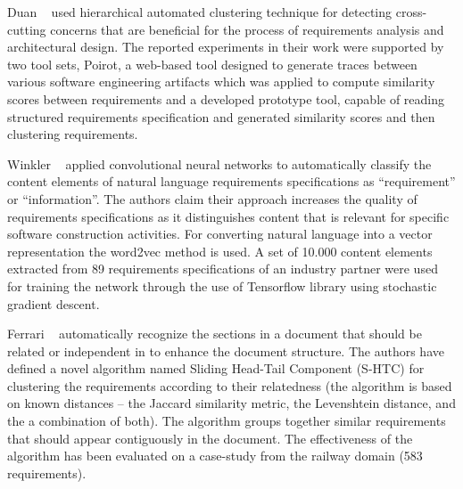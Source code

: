 Duan \etal~\cite{Duan:2007} used hierarchical automated clustering technique for
detecting cross-cutting concerns that are beneficial for the process of
requirements analysis and architectural design. The reported experiments in
their work were supported by two tool sets, Poirot, a
web-based tool designed to generate traces between various software engineering
artifacts which was applied to compute similarity scores between requirements
and a developed prototype tool, capable of reading structured requirements
specification and generated similarity scores and then clustering requirements.

Winkler \etal~\cite{Winkler:2016} applied convolutional neural networks to
automatically classify the content elements of natural language requirements
specifications as “requirement” or “information”. The authors claim their approach increases the
quality of requirements specifications as it distinguishes content that is relevant for specific
software construction activities. For converting natural language into a vector
representation the word2vec method is used. A set of 10.000 content elements
extracted from 89 requirements specifications of an industry partner were used
for training the network through the use of Tensorflow library using stochastic gradient descent.

 Ferrari \etal~\cite{Ferrari:2013} automatically recognize
the sections in a document that should be related or
independent in to enhance the document structure. The authors have defined a
novel algorithm named Sliding Head-Tail Component (S-HTC) for clustering the
requirements according to their relatedness (the algorithm is based on known
distances -- the Jaccard similarity metric, the Levenshtein distance, and the
a combination of both). The algorithm groups together similar
requirements that should appear contiguously in the document. The
effectiveness of the algorithm has been evaluated on a case-study from the
railway domain (583 requirements).

